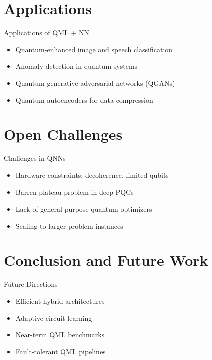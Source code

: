 \documentclass{beamer}
\begin{document}
\section{Applications}
\begin{frame}{Applications of QML + NN}
  \begin{itemize}
    \item Quantum-enhanced image and speech classification
    \item Anomaly detection in quantum systems
    \item Quantum generative adversarial networks (QGANs)
    \item Quantum autoencoders for data compression
  \end{itemize}
\end{frame}

\section{Open Challenges}
\begin{frame}{Challenges in QNNs}
  \begin{itemize}
    \item Hardware constraints: decoherence, limited qubits
    \item Barren plateau problem in deep PQCs
    \item Lack of general-purpose quantum optimizers
    \item Scaling to larger problem instances
  \end{itemize}
\end{frame}

\section{Conclusion and Future Work}
\begin{frame}{Future Directions}
  \begin{itemize}
    \item Efficient hybrid architectures
    \item Adaptive circuit learning
    \item Near-term QML benchmarks
    \item Fault-tolerant QML pipelines
  \end{itemize}
\end{frame}
\end{document}
